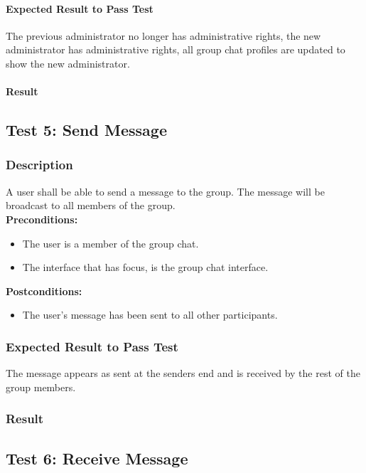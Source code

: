 \documentclass[11pt]{article}
\begin{document}
\paragraph{Expected Result to Pass Test}
The previous administrator no longer has administrative rights, the new administrator has administrative rights, all group chat profiles are updated to show the new administrator.
\paragraph{Result}

\subsection{Test 5: Send Message}
\subsubsection{Description}
A user shall be able to send a message to the group.
The message will be broadcast to all members of the group.\\
\textbf{Preconditions:} 
\begin{itemize}
\item The user is a member of the group chat.
\item The interface that has focus, is the group chat interface.
\end{itemize}
\textbf{Postconditions:}
\begin{itemize}
\item The user's message has been sent to all other participants.
\end{itemize}
\subsubsection{Expected Result to Pass Test}
The message appears as sent at the senders end and is received by the rest of the group members.
\subsubsection{Result}

\subsection{Test 6: Receive Message}
\end{document}
